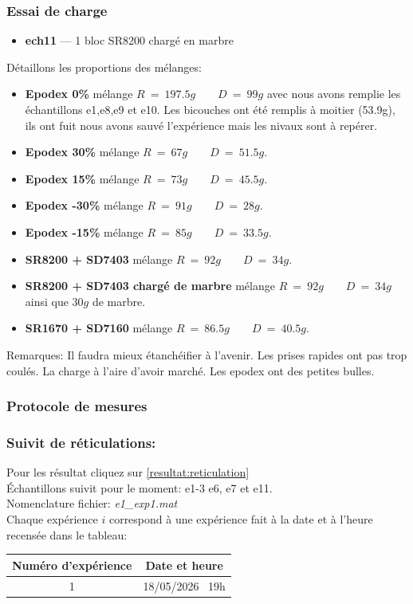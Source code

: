 \subsubsection*{Essai de charge}
\begin{itemize}
	\item \textbf{ech11} — 1 bloc SR8200 chargé en marbre
\end{itemize}
\vspace{1cm}
Détaillons les proportions des mélanges: 

\begin{itemize}
	\item \textbf{Epodex 0\%} mélange $R~=~197.5g \qquad D~=~99g$ avec nous avons remplie les échantillons e1,e8,e9 et e10. Les bicouches ont été remplis à moitier (53.9g), ils ont fuit nous avons sauvé l'expérience mais les nivaux sont à repérer. 
	\item \textbf{Epodex 30\%} mélange $R~=~67g \qquad D~=~51.5g$.
	\item \textbf{Epodex 15\%} mélange $R~=~73g \qquad D~=~45.5g$.
	\item \textbf{Epodex -30\%} mélange $R~=~91g \qquad D~=~28g$.
	\item \textbf{Epodex -15\%} mélange $R~=~85g \qquad D~=~33.5g$.
	\item \textbf{SR8200 + SD7403} mélange $R~=~92g \qquad D~=~34g$.
	\item \textbf{SR8200 + SD7403 chargé de marbre} mélange $R~=~92g \qquad D~=~34g$ ainsi que $30g$ de marbre.
	\item \textbf{SR1670 + SD7160} mélange $R~=~86.5g \qquad D~=~40.5g$.
\end{itemize}

Remarques: Il faudra mieux étanchéifier à l'avenir. Les prises rapides ont pas trop coulés. La charge à l'aire d'avoir marché. Les epodex ont des petites bulles.
\subsubsection{Protocole de mesures}

\subsubsection*{Suivit de réticulations:}
\label{protocol:reticulation}
Pour les résultat cliquez sur \ref{resultat:reticulation}\\
Échantillons suivit pour le moment: e1-3 e6, e7 et e11.\\
Nomenclature fichier: \textit{e1\_exp1.mat} \\
Chaque expérience $i$ correspond à une expérience fait à la date et à l'heure recensée dans le tableau:\\ 
\begin{table}[h!]
	\centering
	\begin{tabular}{|c|c|}
		\hline
		\textbf{Numéro d'expérience} & \textbf{Date et heure} \\
		\hline
		1 & 18/05/2026 \, 19h \\
		\hline
	\end{tabular}
\end{table}

